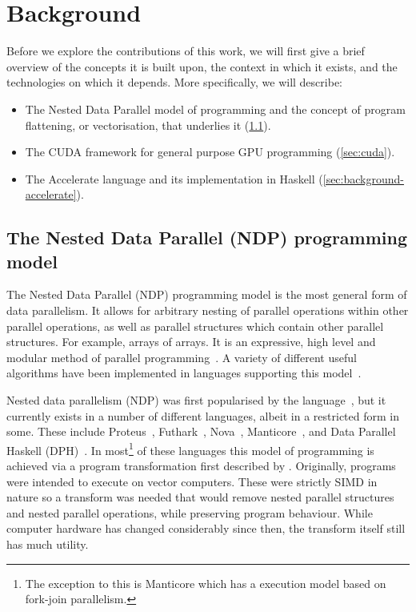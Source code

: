 \chapter{Background}
\label{chap:background}

Before we explore the contributions of this work, we will first give a brief overview of the concepts it is built upon, the context in which it exists, and the technologies on which it depends. More specifically, we will describe:

\begin{itemize}
  \item The Nested Data Parallel model of programming and the concept of program flattening, or vectorisation, that underlies it (\ref{sec:ndp}).
  \item The CUDA framework for general purpose GPU programming (\ref{sec:cuda}).
  \item The Accelerate language and its implementation in Haskell (\ref{sec:background-accelerate}).
\end{itemize}

\section{The Nested Data Parallel (NDP) programming model}
\label{sec:ndp}

The Nested Data Parallel (NDP) programming model is the most general form of data parallelism. It allows for arbitrary nesting of parallel operations within other parallel operations, as well as parallel structures which contain other parallel structures. For example, arrays of arrays. It is an expressive, high level and modular method of parallel programming~\cite{Blelloch:1990vl}. A variety of different useful algorithms have been implemented in languages supporting this model~\cite{Blelloch:nbody94,Blelloch:delaunay96,Blelloch:connected94}.

Nested data parallelism (NDP) was first popularised by the \nesl{} language~\cite{Blelloch:nesl1995}, but it currently exists in a number of different languages, albeit in a restricted form in some. These include Proteus~\cite{proteus-frontiers95}, Futhark~\cite{Henriksen:2017futhark}, Nova~\cite{collins2013nova}, Manticore~\cite{Fluet:2007:manticore}, and Data Parallel Haskell (DPH)~\cite{Jones:2008uu}. In most\footnote{The exception to this is Manticore which has a execution model based on fork-join parallelism.} of these languages this model of programming is achieved via a program transformation first described by \citet{Blelloch:compiling1988}. Originally, \nesl{} programs were intended to execute on vector computers. These were strictly SIMD in nature so a transform was needed that would remove nested parallel structures and nested parallel operations, while preserving program behaviour. While computer hardware has changed considerably since then, the transform itself still has much utility.

